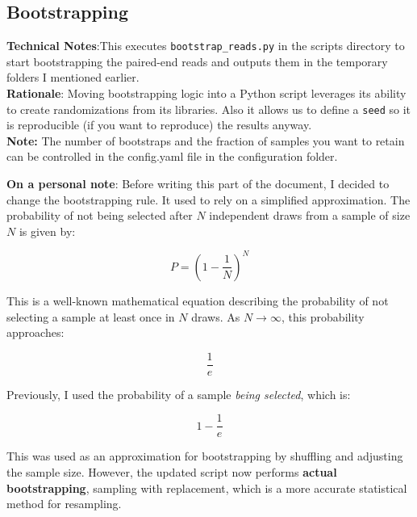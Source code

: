 \documentclass[11pt]{report}
\begin{document}
\subsection{Bootstrapping}
\textbf{Technical Notes}:This executes \texttt{bootstrap\_reads.py} in the scripts directory to start bootstrapping the paired-end reads and outputs them in the temporary folders I mentioned earlier. \\
\textbf{Rationale}: Moving bootstrapping logic into a Python script leverages its ability to create randomizations from its libraries. Also it allows us to define a \texttt{seed} so it is reproducible (if you want to reproduce) the results anyway.
\\ \textbf{Note:} The number of bootstraps and the fraction of samples you want to retain can be controlled in the config.yaml file in the configuration folder. \\

\begin{tcolorbox}[title= Update Sep 19 2024, coltitle=AntiqueWhite1]
\textbf{On a personal note}: Before writing this part of the document, I decided to change the bootstrapping rule. It used to rely on a simplified approximation. The probability of not being selected after \(N\) independent draws from a sample of size \(N\) is given by:

\[
P = \left( 1 - \frac{1}{N} \right)^N
\]

This is a well-known mathematical equation describing the probability of not selecting a sample at least once in \(N\) draws. As \( N \to \infty \), this probability approaches:

\[
\frac{1}{e}
\]

Previously, I used the probability of a sample \textit{being selected}, which is:

\[
1 - \frac{1}{e}
\]

This was used as an approximation for bootstrapping by shuffling and adjusting the sample size. However, the updated script now performs \textbf{actual bootstrapping}, sampling with replacement, which is a more accurate statistical method for resampling.
\end{tcolorbox}
\end{document}
